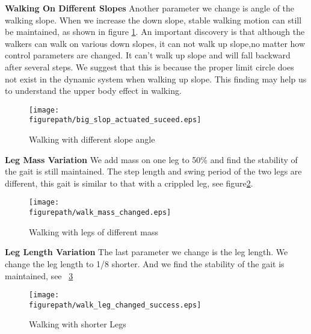 \textbf{Walking On Different Slopes}
Another parameter we change is angle of the walking slope. 
When we increase the down slope, stable walking motion can still be maintained, as shown in figure \ref{fig:diff_slop}.
An important discovery is that although the walkers can walk on various down slopes, it can not walk up slope,no matter how control parameters are changed.
It can’t walk up slope and will fall backward after several steps. 
We suggest that this is because the proper limit circle does not exist in the dynamic system when walking up slope.
This finding may help us to understand the upper body effect in walking.

\begin{figure}[h]
\centering
\texttt{[image: \\figurepath/big\_slop\_actuated\_suceed.eps]}
\caption
{
Walking with different slope angle
}
\label{fig:diff_slop}
\end{figure}

\textbf{Leg Mass Variation}
We add mass on one leg to 50\% and find the stability of the gait is still maintained. 
The step length and swing period of the two legs are different, this gait is similar to that with a crippled leg, see figure\ref{fig:leg mass}.

\begin{figure}[H]
\centering
\texttt{[image: \\figurepath/walk\_mass\_changed.eps]}
\label{fig:walk_mass_changed}
\caption
{
Walking with legs of different mass
}
\label{fig:leg mass}
\end{figure}

\textbf{Leg Length Variation}
The last parameter we change is the leg length. 
We change the leg length to 1/8 shorter. 
And we find the stability of the gait is maintained, see \figurename ~\ref{fig:walk_leg_changed}

\begin{figure}[H]
\centering
\texttt{[image: \\figurepath/walk\_leg\_changed\_success.eps]}
\caption
{
Walking with shorter Legs
}
\label{fig:walk_leg_changed}
\end{figure}

